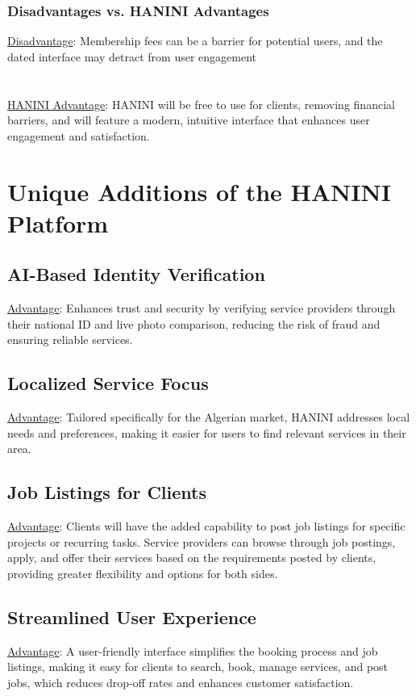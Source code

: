 \documentclass[12pt,a4paper]{report}
\begin{document}
\subsection*{Disadvantages vs. HANINI Advantages}
\underline {Disadvantage}: Membership fees can be a barrier for potential users, and the dated interface may detract from user engagement\\
\textbf{                      }\\
\textbf{                      }\\
\underline {HANINI Advantage}:  HANINI will be free to use for clients, removing financial barriers, and will feature a modern, intuitive interface that enhances user engagement and satisfaction.

\chapter{Unique Additions of the HANINI Platform}
\section{AI-Based Identity Verification}
\underline {Advantage}: Enhances trust and security by verifying service providers through their national ID and live photo comparison, reducing the risk of fraud and ensuring reliable services.

\section{Localized Service Focus}
\underline {Advantage}: Tailored specifically for the Algerian market, HANINI addresses local needs and preferences, making it easier for users to find relevant services in their area.

\section{Job Listings for Clients}
\underline {Advantage}: Clients will have the added capability to post job listings for specific projects or recurring tasks. Service providers can browse through job postings, apply, and offer their services based on the requirements posted by clients, providing greater flexibility and options for both sides.

\section{Streamlined User Experience}
\underline {Advantage}:  A user-friendly interface simplifies the booking process and job listings, making it easy for clients to search, book, manage services, and post jobs, which reduces drop-off rates and enhances customer satisfaction.
\end{document}
